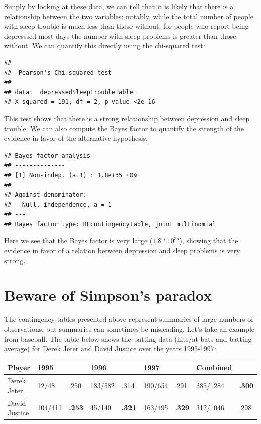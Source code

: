 \documentclass[12pt,]{book}
\theoremstyle{definition}
\theoremstyle{definition}
\theoremstyle{definition}
\theoremstyle{remark}
\begin{document}
Simply by looking at these data, we can tell that it is likely that there is a relationship between the two variables; notably, while the total number of people with sleep trouble is much less than those without, for people who report being depresssed most days the number with sleep problems is greater than those without. We can quantify this directly using the chi-squared test:

\begin{verbatim}
## 
##  Pearson's Chi-squared test
## 
## data:  depressedSleepTroubleTable
## X-squared = 191, df = 2, p-value <2e-16
\end{verbatim}

This test shows that there is a strong relationship between depression and sleep trouble. We can also compute the Bayes factor to quantify the strength of the evidence in favor of the alternative hypothesis:

\begin{verbatim}
## Bayes factor analysis
## --------------
## [1] Non-indep. (a=1) : 1.8e+35 ±0%
## 
## Against denominator:
##   Null, independence, a = 1 
## ---
## Bayes factor type: BFcontingencyTable, joint multinomial
\end{verbatim}

Here we see that the Bayes factor is very large (\(1.8 * 10^{35}\)), showing that the evidence in favor of a relation between depression and sleep problems is very strong.

\hypertarget{beware-of-simpsons-paradox}{%
\section{Beware of Simpson's paradox}\label{beware-of-simpsons-paradox}}

The contingency tables presented above represent summaries of large numbers of observations, but summaries can sometimes be misleading. Let's take an example from baseball. The table below shows the batting data (hits/at bats and batting average) for Derek Jeter and David Justice over the years 1995-1997:

\begin{longtable}[]{@{}lllllllll@{}}
\toprule
Player & 1995 & & 1996 & & 1997 & & Combined &\tabularnewline
\midrule
\endhead
Derek Jeter & 12/48 & .250 & 183/582 & .314 & 190/654 & .291 & 385/1284 & \textbf{.300}\tabularnewline
David Justice & 104/411 & \textbf{.253} & 45/140 & \textbf{.321} & 163/495 & \textbf{.329} & 312/1046 & .298\tabularnewline
\bottomrule
\end{longtable}
\end{document}
